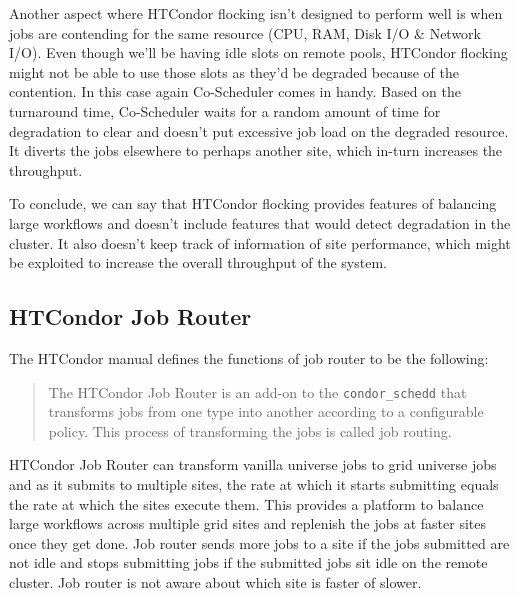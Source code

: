 \documentclass[ms,electronic,double]{nuthesis}
\begin{document}
Another aspect where HTCondor flocking isn't designed to perform well is when jobs are 
contending for the same resource (CPU, RAM, Disk I/O \& Network I/O). Even though we'll be 
having idle slots on remote pools, HTCondor flocking might not be able to use those 
slots as they'd be degraded because of the contention. In this case again 
Co-Scheduler comes in handy. Based on the turnaround time, Co-Scheduler waits for a random 
amount of time for degradation to clear and doesn't put excessive job load on the 
degraded resource. It diverts the jobs elsewhere to perhaps another site, which in-turn increases the 
throughput.

To conclude, we can say that HTCondor flocking provides features of balancing 
large workflows and doesn't include features that would detect degradation in 
the cluster. It also doesn't keep track of information of site performance, which might be exploited to increase the overall throughput of the system. 

\subsection{HTCondor Job Router}

The HTCondor manual defines the functions of job router to be the following:
\begin{quotation}

The HTCondor Job Router is an add-on to the \texttt{condor\_schedd} that transforms jobs from one type into 
another according to a configurable policy\cite{manual56}. 
This process of transforming the jobs is called job routing.
\end{quotation}

HTCondor Job Router can transform vanilla universe jobs to grid universe jobs and 
as it submits to multiple sites, the rate at which it starts submitting equals 
the rate at which the sites execute them. This provides a platform to balance large 
workflows across multiple grid sites and replenish the jobs at
faster sites once they get done. Job router sends more jobs to a site if 
the jobs submitted are not idle and stops submitting jobs if the submitted jobs 
sit idle on the remote cluster. Job router is not aware about which site is 
faster of slower.
\end{document}
